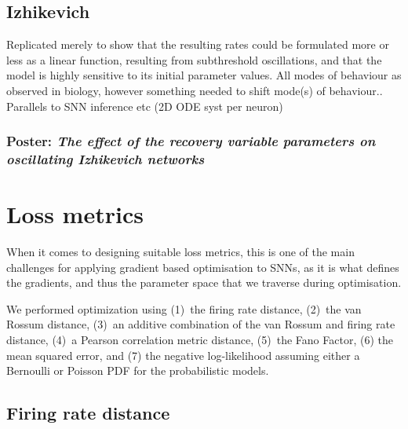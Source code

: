 \documentclass[mphil,deptreport,ianc]{infthesis} %
\begin{document}
\subsection{Izhikevich}

Replicated \cite{Oliveira2019} merely to show that the resulting rates could be formulated more or less as a linear function, resulting from subthreshold oscillations, and that the model is highly sensitive to its initial parameter values.
All modes of behaviour as observed in biology, however something needed to shift mode(s) of behaviour..
Parallels to SNN inference etc
(2D ODE syst per neuron)

\subsubsection{Poster: \textit{The effect of the recovery variable parameters on oscillating Izhikevich networks}}



\section{Loss metrics}


When it comes to designing suitable loss metrics, this is one of the main challenges for applying gradient based optimisation to SNNs, as it is what defines the gradients, and thus the parameter space that we traverse during optimisation.


We performed optimization using (1)~the firing rate distance, (2)~the van Rossum distance, (3)~an additive combination of the van Rossum and firing rate distance, (4)~a Pearson correlation metric distance, (5)~the Fano Factor, (6) the mean squared error, and (7) the negative log-likelihood assuming either a Bernoulli or Poisson PDF for the probabilistic models.

\subsection{Firing rate distance}
\end{document}
